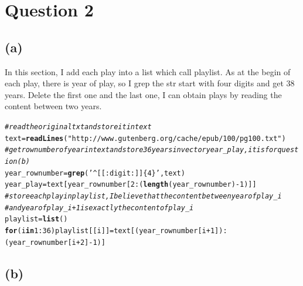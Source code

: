 \documentclass{article}\usepackage[]{graphicx}\usepackage[]{color}
\makeatletter
\newcommand{\hlnum}[1]{\textcolor[rgb]{0.686,0.059,0.569}{#1}}%
\newcommand{\hlstr}[1]{\textcolor[rgb]{0.192,0.494,0.8}{#1}}%
\newcommand{\hlcom}[1]{\textcolor[rgb]{0.678,0.584,0.686}{\textit{#1}}}%
\newcommand{\hlopt}[1]{\textcolor[rgb]{0,0,0}{#1}}%
\newcommand{\hlstd}[1]{\textcolor[rgb]{0.345,0.345,0.345}{#1}}%
\newcommand{\hlkwa}[1]{\textcolor[rgb]{0.161,0.373,0.58}{\textbf{#1}}}%
\newcommand{\hlkwb}[1]{\textcolor[rgb]{0.69,0.353,0.396}{#1}}%
\newcommand{\hlkwd}[1]{\textcolor[rgb]{0.737,0.353,0.396}{\textbf{#1}}}%
\newenvironment{kframe}{%
 \def\at@end@of@kframe{}%
 \ifinner\ifhmode%
  \def\at@end@of@kframe{\end{minipage}}%
  \begin{minipage}{\columnwidth}%
 \fi\fi%
 \def\FrameCommand##1{\hskip\@totalleftmargin \hskip-\fboxsep
 \colorbox{shadecolor}{##1}\hskip-\fboxsep
     \hskip-\linewidth \hskip-\@totalleftmargin \hskip\columnwidth}%
 \MakeFramed {\advance\hsize-\width
   \@totalleftmargin\z@ \linewidth\hsize
   \@setminipage}}%
 {\par\unskip\endMakeFramed%
 \at@end@of@kframe}
\newenvironment{knitrout}{}{} %
\makeatother
\begin{document}
\section{Question 2}
 
\subsection{(a)}

In this section, I add each play into a list which call playlist. As at the begin of each play, there is year of play, so I grep the str start with four digits and get 38 years. Delete the first one and the last one, I can obtain plays by reading the content between two years.
\begin{knitrout}
\color{fgcolor}\begin{kframe}
\begin{alltt}
\hlcom{#read the original txt and store it in text}
\hlstd{text}\hlkwb{=}\hlkwd{readLines}\hlstd{(}\hlstr{"http://www.gutenberg.org/cache/epub/100/pg100.txt"}\hlstd{)}
\hlcom{#get rownumber of year in text and store 36 years in vector year_play,it is for question (b)}
\hlstd{year_rownumber}\hlkwb{=}\hlkwd{grep}\hlstd{(}\hlstr{'^[[:digit:]]\{4\}'}\hlstd{,text)}
\hlstd{year_play}\hlkwb{=}\hlstd{text[year_rownumber[}\hlnum{2}\hlopt{:}\hlstd{(}\hlkwd{length}\hlstd{(year_rownumber)}\hlopt{-}\hlnum{1}\hlstd{)]]}
\hlcom{#store each play in playlist,I believe that the content between year of play_i }
\hlcom{#and year of play_i+1 is exactly the content of play_i}
\hlstd{playlist}\hlkwb{=}\hlkwd{list}\hlstd{()}
\hlkwa{for}\hlstd{(i} \hlkwa{in} \hlnum{1}\hlopt{:}\hlnum{36}\hlstd{) playlist[[i]]}\hlkwb{=}\hlstd{text[(year_rownumber[i}\hlopt{+}\hlnum{1}\hlstd{])}\hlopt{:}\hlstd{(year_rownumber[i}\hlopt{+}\hlnum{2}\hlstd{]}\hlopt{-}\hlnum{1}\hlstd{)]}
\end{alltt}
\end{kframe}
\end{knitrout}

\subsection{(b)}
\end{document}
